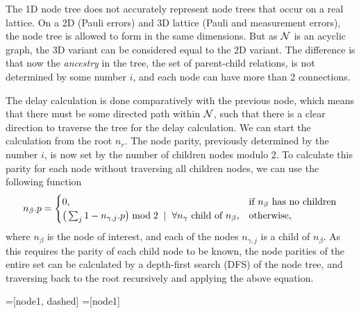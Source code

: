 The 1D node tree does not accurately represent node trees that occur on a real lattice. On a 2D (Pauli errors) and 3D lattice (Pauli and measurement errors), the node tree is allowed to form in the same dimensions. But as $\mathcal{N}$ is an acyclic graph, the 3D variant can be considered equal to the 2D variant. The difference is that now the \emph{ancestry} in the tree, the set of parent-child relations, is not determined by some number $i$, and each node can have more than 2 connections.

The delay calculation is done comparatively with the previous node, which means that there must be some directed path within $\mathcal{N}$, such that there is a clear direction to traverse the tree for the delay calculation. We can start the calculation from the root $n_r$. The node parity, previously determined by the number $i$, is now set by the number of children nodes modulo 2. To calculate this parity for each node without traversing all children nodes, we can use the following function
\begin{equation}\label{eq:nodeparitypart}
  n_\beta.p =
  \begin{cases}
    0, & \mbox{if $n_\beta$ has no children}  \\
    \big( \sum_{j} 1-n_{\gamma,j}.p \big ) \bmod 2 \hspace{.2cm} | \hspace{.2cm} \forall n_\gamma \mbox{ child of } n_\beta, & \mbox{otherwise},
  \end{cases}
\end{equation}
where $n_\beta$ is the node of interest, and each of the nodes $n_{\gamma,j}$ is a child of $n_\beta$. As this requires the parity of each child node to be known, the node parities of the entire set can be calculated by a depth-first search (DFS) of the node tree, and traversing back to the root recursively and applying the above equation.

=[node1, dashed]
=[node1]

